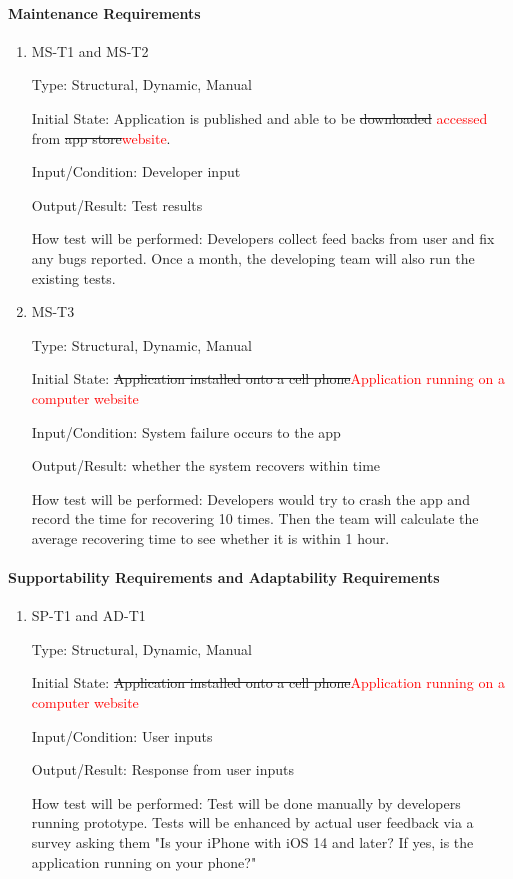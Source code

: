 \documentclass[12pt, titlepage]{article}
\begin{document}
\paragraph{Maintenance Requirements}
\begin{enumerate}

\item{MS-T1 and MS-T2\\}

Type: Structural, Dynamic, Manual
					
Initial State: Application is published and able to be \sout{downloaded} \textcolor{red}{accessed} from \sout{app store}\textcolor{red}{website}.
					
Input/Condition: Developer input
					
Output/Result: Test results
					
How test will be performed: Developers collect feed backs from user and fix any bugs reported. Once a month, the developing team will also run the existing tests.
\item{MS-T3\\}

Type: Structural, Dynamic, Manual
					
Initial State: \sout{Application installed onto a cell phone}\textcolor{red}{Application running on a computer website}
					
Input/Condition: System failure occurs to the app
					
Output/Result: whether the system recovers within time
					
How test will be performed: Developers would try to crash the app and record the time for recovering 10 times. Then the team will calculate the average recovering time to see whether it is within 1 hour.
\end{enumerate}
\paragraph{Supportability Requirements and Adaptability Requirements}

\begin{enumerate}

\item{SP-T1 and AD-T1\\}

Type: Structural, Dynamic, Manual
					
Initial State: \sout{Application installed onto a cell phone}\textcolor{red}{Application running on a computer website}
					
Input/Condition: User inputs
					
Output/Result: Response from user inputs
					
How test will be performed: Test will be done manually by developers running prototype. Tests will be enhanced by actual user feedback via a survey asking them "Is your iPhone with iOS 14 and later? If yes, is the application running on your phone?"

\end{enumerate}
\end{document}
